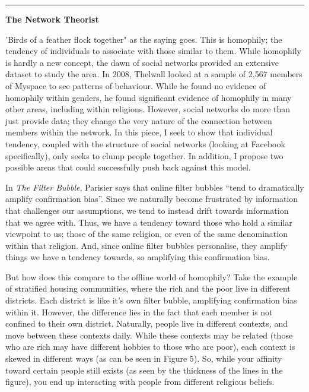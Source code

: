 \documentclass[]{article}
\begin{document}
\begin{center}\rule{0.5\linewidth}{\linethickness}\end{center}

\textbf{The Network Theorist}

'Birds of a feather flock together" as the saying goes. This is
homophily; the tendency of individuals to associate with those similar
to them. While homophily is hardly a new concept, the dawn of social
networks provided an extensive dataset to study the area. In 2008,
Thelwall looked at a sample of 2,567 members of Myspace to see patterns
of behaviour\autocite{ThelwallHomophilyMySpace2009}. While he found no
evidence of homophily within genders, he found significant evidence of
homophily in many other areas, including within
religions\autocite[pg 229]{ThelwallHomophilyMySpace2009}. However,
social networks do more than just provide data; they change the very
nature of the connection between members within the network. In this
piece, I seek to show that individual tendency, coupled with the
structure of social networks (looking at Facebook specifically), only
seeks to clump people together. In addition, I propose two possible
areas that could successfully push back against this model.

In \emph{The Filter Bubble}, Parisier says that online filter bubbles
``tend to dramatically amplify confirmation
bias''\autocite[pg 88]{PariserFilterBubblewhat2012}. Since we naturally
become frustrated by information that challenges our assumptions, we
tend to instead drift towards information that we agree with. Thus, we
have a tendency toward those who hold a similar viewpoint to us; those
of the same religion, or even of the same denomination within that
religion. And, since online filter bubbles personalise, they amplify
things we have a tendency towards, so amplifying this confirmation
bias\autocite[pg 88]{PariserFilterBubblewhat2012}.

But how does this compare to the offline world of homophily? Take the
example of stratified housing communities, where the rich and the poor
live in different districts. Each district is like it's own filter
bubble, amplifying confirmation bias within it. However, the difference
lies in the fact that each member is not confined to their own district.
Naturally, people live in different contexts, and move between these
contexts daily. While these contexts may be related (those who are rich
may have different hobbies to those who are poor), each context is
skewed in different ways (as can be seen in Figure 5). So, while your
affinity toward certain people still exists (as seen by the thickness of
the lines in the figure), you end up interacting with people from
different religious beliefs.
\end{document}
